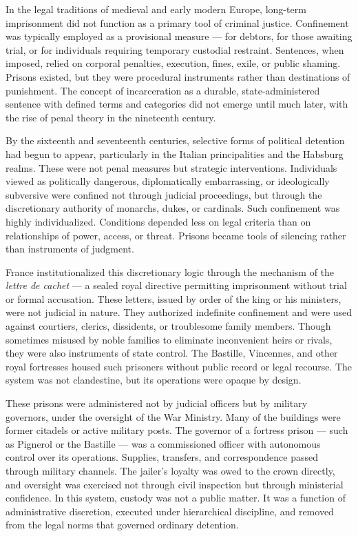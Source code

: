 In the legal traditions of medieval and early modern Europe, long-term imprisonment did not function as a primary tool of criminal justice. Confinement was typically employed as a provisional measure — for debtors, for those awaiting trial, or for individuals requiring temporary custodial restraint. Sentences, when imposed, relied on corporal penalties, execution, fines, exile, or public shaming. Prisons existed, but they were procedural instruments rather than destinations of punishment. The concept of incarceration as a durable, state-administered sentence with defined terms and categories did not emerge until much later, with the rise of penal theory in the nineteenth century.

By the sixteenth and seventeenth centuries, selective forms of political detention had begun to appear, particularly in the Italian principalities and the Habsburg realms. These were not penal measures but strategic interventions. Individuals viewed as politically dangerous, diplomatically embarrassing, or ideologically subversive were confined not through judicial proceedings, but through the discretionary authority of monarchs, dukes, or cardinals. Such confinement was highly individualized. Conditions depended less on legal criteria than on relationships of power, access, or threat. Prisons became tools of silencing rather than instruments of judgment.

France institutionalized this discretionary logic through the mechanism of the \textit{lettre de cachet }— a sealed royal directive permitting imprisonment without trial or formal accusation. These letters, issued by order of the king or his ministers, were not judicial in nature. They authorized indefinite confinement and were used against courtiers, clerics, dissidents, or troublesome family members. Though sometimes misused by noble families to eliminate inconvenient heirs or rivals, they were also instruments of state control. The Bastille, Vincennes, and other royal fortresses housed such prisoners without public record or legal recourse. The system was not clandestine, but its operations were opaque by design.

These prisons were administered not by judicial officers but by military governors, under the oversight of the War Ministry. Many of the buildings were former citadels or active military posts. The governor of a fortress prison — such as Pignerol or the Bastille — was a commissioned officer with autonomous control over its operations. Supplies, transfers, and correspondence passed through military channels. The jailer’s loyalty was owed to the crown directly, and oversight was exercised not through civil inspection but through ministerial confidence. In this system, custody was not a public matter. It was a function of administrative discretion, executed under hierarchical discipline, and removed from the legal norms that governed ordinary detention.

